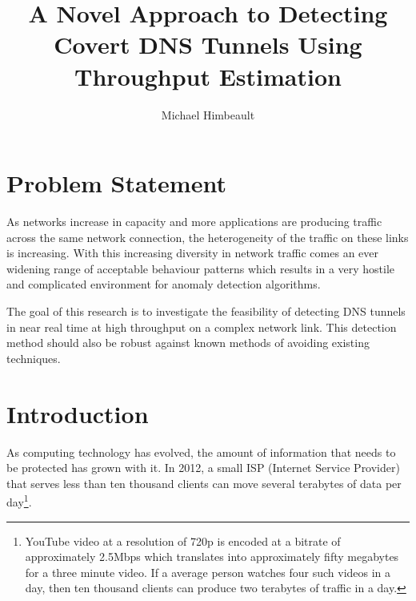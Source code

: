 \documentclass{article}
\theoremstyle{remark}
\theoremstyle{definition}
\theoremstyle{definition}
\theoremstyle{definition}
\begin{document}

\title{A Novel Approach to Detecting Covert DNS Tunnels Using Throughput Estimation}
\author{Michael Himbeault}

\maketitle


\tableofcontents

\newpage

\section{Problem Statement}

As networks increase in capacity and more applications are producing traffic across the same network connection, the heterogeneity of the traffic on these links is increasing. With this increasing diversity in network traffic comes an ever widening range of acceptable behaviour patterns which results in a very hostile and complicated environment for anomaly detection algorithms.

The goal of this research is to investigate the feasibility of detecting DNS tunnels in near real time at high throughput on a complex network link. This detection method should also be robust against known methods of avoiding existing techniques.

\section{Introduction}

As computing technology has evolved, the amount of information that needs to be protected has grown with it. In 2012, a small ISP (Internet Service Provider) that serves less than ten thousand clients can move several terabytes of data per day\footnote{YouTube video at a resolution of 720p is encoded at a bitrate of approximately 2.5Mbps which translates into approximately fifty megabytes for a three minute video. If a average person watches four such videos in a day, then ten thousand clients can produce two terabytes of traffic in a day.}.
\end{document}
